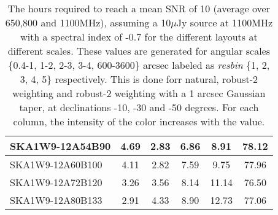 \begin{table}[H]
{{\begin{tabular}{|lccccc|}
SKA1W9-12A54B90 & 4.69 \cellcolor{blue!60.00} & 2.83 \cellcolor{red!18.10} & 6.86 \cellcolor{green!18.00} & 8.91 \cellcolor{orange!18.00} & 78.12 \cellcolor{purple!60.00}\\ \hline 
SKA1W9-12A60B100 & 4.11 \cellcolor{blue!46.31} & 2.82 \cellcolor{red!18.00} & 7.59 \cellcolor{green!28.25} & 9.75 \cellcolor{orange!27.24} & 77.96 \cellcolor{purple!59.00}\\ \hline 
SKA1W9-12A72B120 & 3.26 \cellcolor{blue!26.26} & 3.56 \cellcolor{red!25.16} & 8.14 \cellcolor{green!35.98} & 11.14 \cellcolor{orange!42.52} & 76.50 \cellcolor{purple!49.92}\\ \hline 
SKA1W9-12A80B133 & 2.91 \cellcolor{blue!18.00} & 4.33 \cellcolor{red!32.61} & 8.90 \cellcolor{green!46.66} & 12.73 \cellcolor{orange!60.00} & 77.06 \cellcolor{purple!53.40}\\ \hline 
\end{tabular}}
\vspace{0.000000cm}
\hspace{1cm} 
\vspace{0.000000cm}
\hspace{1cm} 

\vspace{.25cm}
\caption{The hours required to reach a mean SNR of 10 (average over 650,800 and 1100MHz), assuming a 10$\mu$Jy source at 1100MHz with a spectral index of -0.7 for the different layouts at different scales. These values are generated for angular scales \{0.4-1, 1-2, 2-3, 3-4, 600-3600\} arcsec labeled as {\it resbin} \{1, 2, 3, 4, 5\} respectively. This is done forr natural, robust-2 weighting and robust-2 weighting with a 1 arcsec Gaussian taper, at declinations -10, -30 and -50 degrees. For each column, the intensity of the color increases with the value.}\label{tab:hours}}
 \end{table}
